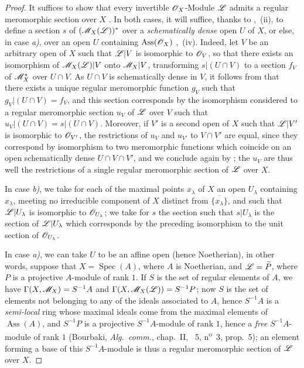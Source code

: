 \begin{proof}
It suffices to show that every invertible $\mathscr{O}_X$-Module $\mathscr{L}$ admits a regular meromorphic section over $X$ .
In both cases, it will suffice, thanks to ,~(ii), to define a section $s$ of $(\mathscr{M}_X(\mathscr{L}))^*$ over a \emph{schematically dense} open $U$ of $X$, or else, in case \emph{a)}, over an open $U$ containing $\operatorname{Ass}(\mathscr{O}_X)$ ,~(iv).
Indeed, let $V$ be an arbitrary open of $X$ such that $\mathscr{L}|V$ is isomorphic to $\mathscr{O}_V$, so that there exists an isomorphism of $\mathscr{M}_X(\mathscr{L})|V$ onto $\mathscr{M}_X|V$, transforming $s|(U\cap V)$ to a section $f_V$ of $\mathscr{M}_X^*$ over $U\cap V$.
As $U\cap V$ is schematically dense in $V$, it follows from  that there exists a unique regular meromorphic function $g_V$ such that $g_V|(U\cap V)=f_V$, and this section corresponds by the isomorphism considered to a regular meromorphic section $u_V$ of $\mathscr{L}$ over $V$ such that $u_V|(U\cap V)=s|(U\cap V)$.
Moreover, if $V'$ is a second open of $X$ such that $\mathscr{L}|V'$ is isomorphic to $\mathscr{O}_{V'}$, the restrictions of $u_V$ and $u_{V'}$ to $V\cap V'$ are equal, since they correspond by isomorphism to two meromorphic functions which coincide on an open schematically dense $U\cap V\cap V'$, and we conclude again by ;
the $u_V$ are thus well the restrictions of a single regular meromorphic section of $\mathscr{L}$ over $X$.

In case \emph{b)}, we take for each of the maximal points $x_\lambda$ of $X$ an open $U_\lambda$ containing $x_\lambda$, meeting no irreducible component of $X$ distinct from $\overline{\{x_\lambda\}}$, and such that $\mathscr{L}|U_\lambda$ is isomorphic to $\mathscr{O}_{U_\lambda}$;
we take for $s$ the section such that $s|U_\lambda$ is the section of $\mathscr{L}|U_\lambda$ which corresponds by the preceding isomorphism to the unit section of $\mathscr{O}_{U_\lambda}$.

In case \emph{a)}, we can take $U$ to be an affine open (hence Noetherian), in other words, suppose that $X=\operatorname{Spec}(A)$, where $A$ is Noetherian, and $\mathscr{L}=\widetilde{P}$, where $P$ is a projective $A$-module of rank $1$.
If $S$ is the set of regular elements of $A$, we have $\Gamma(X,\mathscr{M}_X)=S^{-1}A$  and $\Gamma(X,\mathscr{M}_X(\mathscr{L}))=S^{-1}P$;
now $S$ is the set of elements not belonging to any of the ideals associated to $A$, hence $S^{-1}A$ is a \emph{semi-local} ring whose maximal ideals come from the maximal elements of $\operatorname{Ass}(A)$, and $S^{-1}P$ is a projective $S^{-1}A$-module of rank $1$, hence a \emph{free} $S^{-1}A$-module of rank $1$ (Bourbaki, \emph{Alg.\ comm.}, chap.~II, \textsection~5, n\textsuperscript{o}~3, prop.~5);
an element forming a base of this $S^{-1}A$-module is thus  a regular meromorphic section of $\mathscr{L}$ over $X$.
\end{proof}

